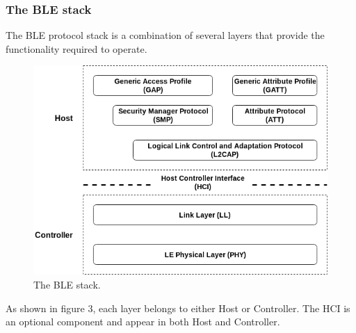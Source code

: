 \subsubsection{The BLE stack}
\justify
The BLE protocol stack is a combination of several layers that provide the 
functionality required to operate. 
\begin{figure}[H]
    \centering
    \includegraphics[scale=0.6]{figure/figure03_ble_stack.png}
    \caption{The BLE stack.}
\end{figure}
\justify
As shown in figure 3, each layer belongs to either Host or Controller. 
The HCI is an optional component and appear in both Host and Controller.
